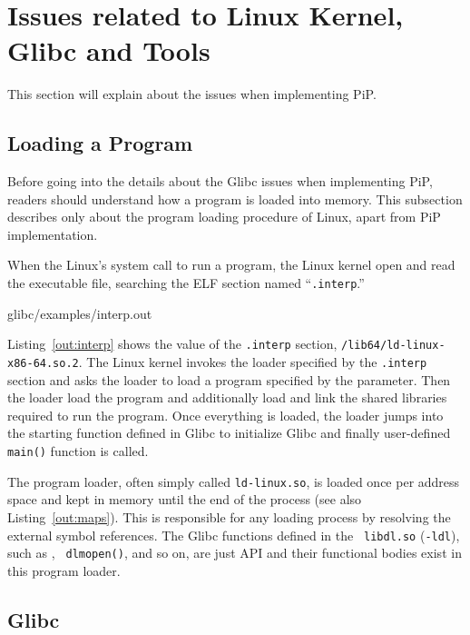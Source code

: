 
\section{Issues related to Linux Kernel, Glibc and Tools}

This section will explain about the issues when implementing PiP. 

\subsection{Loading a Program}

Before going into the details about the Glibc issues when implementing
PiP, readers should understand how a program is loaded into
memory. This subsection describes only about the program loading
procedure of Linux, apart from PiP implementation.

When the Linux's  system call to run a program, the
Linux kernel open and read the executable file, searching the ELF
section named ``{\tt .interp}.''

 {glibc/examples/interp.out}

Listing~\ref{out:interp} shows the value of the {\tt .interp} section,
{\tt /lib64/ld-linux-x86-64.so.2}. The Linux kernel
invokes the loader specified by the {\tt .interp} section and asks the
loader to load a program specified by the  parameter.
Then the loader load the program and additionally load and link the shared
libraries required to run the program. Once everything is loaded, the
loader jumps into the starting function defined in Glibc to initialize
Glibc and finally user-defined {\tt main()} function is called.

The program loader, often simply called {\tt ld-linux.so}, is loaded
once per address space and kept in memory until the end of the
process (see also Listing~\ref{out:maps}). This is responsible for any
loading process by resolving the 
external symbol references. The Glibc functions defined in the {\tt
  libdl.so} ({\tt -ldl}), such as , {\tt
  dlmopen()},  and so on, are just API 
and their functional bodies exist in this program loader.

\subsection{Glibc}

